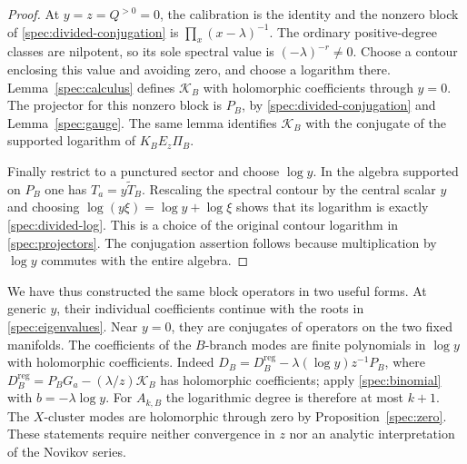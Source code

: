 \begin{proof}
At $y=z=Q^{>0}=0$, the calibration is the identity and the
nonzero block of \eqref{spec:divided-conjugation} is
$\prod_x(x-\lambda)^{-1}$.  The ordinary positive-degree
classes are nilpotent, so its sole spectral value is
$(-\lambda)^{-r}\neq0$.  Choose a contour enclosing this
value and avoiding zero, and choose a logarithm there.
Lemma~\ref{spec:calculus} defines $\mathscr K_B$ with
holomorphic coefficients through $y=0$.  The projector for
this nonzero block is $P_B$, by
\eqref{spec:divided-conjugation} and
Lemma~\ref{spec:gauge}.  The same lemma identifies
$\mathscr K_B$ with the conjugate of the supported logarithm
of $K_BE_z\Pi_B$.

Finally restrict to a punctured sector and choose $\log y$.
In the algebra supported on $P_B$ one has
$T_a=y\widetilde T_B$.  Rescaling the spectral contour by
the central scalar $y$ and choosing
$\log(y\xi)=\log y+\log\xi$ shows that its logarithm is
exactly \eqref{spec:divided-log}.  This is a choice of the
original contour logarithm in \eqref{spec:projectors}.
The conjugation assertion follows because multiplication
by $\log y$ commutes with the entire algebra.
\end{proof}

We have thus constructed the same block operators in two useful
forms.  At generic $y$, their individual coefficients continue
with the roots in \eqref{spec:eigenvalues}.  Near $y=0$, they
are conjugates of operators on the two fixed manifolds.
The coefficients of the $B$-branch modes are finite polynomials
in $\log y$ with holomorphic coefficients.  Indeed
$D_B=D_B^{\mathrm{reg}}-\lambda(\log y)z^{-1}P_B$, where
$D_B^{\mathrm{reg}}=P_BG_a-(\lambda/z)\mathscr K_B$
has holomorphic coefficients; apply \eqref{spec:binomial} with
$b=-\lambda\log y$.  For $A_{k,B}$ the logarithmic degree
is therefore at most $k+1$.  The $X$-cluster modes are
holomorphic through zero by Proposition~\ref{spec:zero}.
These statements require neither convergence in $z$ nor an
analytic interpretation of the Novikov series.
